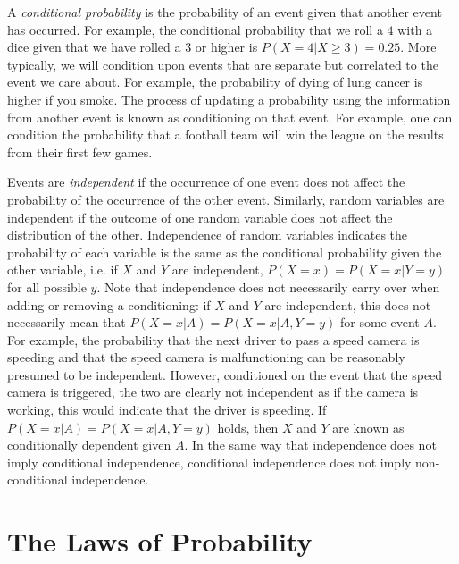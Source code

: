 A \emph{conditional probability} is the probability of an event given that another event has occurred.
For example, the conditional probability that we roll a $4$ with a dice given that we have rolled a $3$ or
higher is $P(X=4 | X\ge3) = 0.25$.  More typically, we will condition upon events that are separate but
correlated to the event we care about.  For example, the probability of dying of lung cancer is higher
if you smoke.  The process of updating a probability using the information from another event is
known as conditioning on that event.  For example, one can condition the probability that a football team will win the league on the results from their first few games.

Events are \emph{independent} if the occurrence of one event does not affect the probability of 
the occurrence of the other event.  Similarly, random variables are independent if the outcome of
one random variable does not affect the distribution of the other.  Independence of random variables
indicates the probability of each variable is the same as the conditional probability given the other
variable, i.e. if $X$ and $Y$ are independent, $P(X=x)=P(X=x|Y=y)$ for all possible $y$.  Note that 
independence does not necessarily carry over when adding or removing a conditioning:
if $X$ and $Y$ are independent, this does not necessarily mean that $P(X=x|A) = P(X=x|A,Y=y)$
for some event $A$.  For example, the probability that the next driver to pass a speed camera
is speeding and that the speed camera is
malfunctioning can be reasonably presumed to be independent.  However, conditioned on the
event that the speed camera is triggered, the two are clearly not independent as if the camera is working,
this would indicate that the driver is speeding.
If $P(X=x|A) = P(X=x|A,Y=y)$ holds, then $X$ and
$Y$ are known as conditionally dependent given $A$.  In the same way that independence does not
imply conditional independence, conditional independence does not imply non-conditional independence.

\section{The Laws of Probability}
\label{sec:prob:laws}

